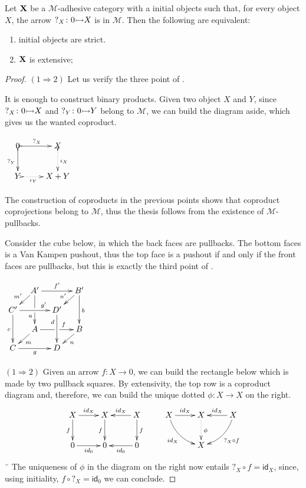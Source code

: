 \documentclass[a4paper,UKenglish,cleveref,pdftex, thm-restate,numberwithinsect]{lipics}
\newcommand{\id}[1]{\mathsf{id}_{#1}}
\newcommand{\mto}[0]{\scalebox{1}{$\rightarrowtail$}}
\def\C{\textbf {\textup{C}}}
\def\X{\textbf {\textup{X}}}
\def\Y{\textbf {\textup{Y}}}
\begin{document}
\begin{proposition}	\label{prop:ext}
Let $\X$ be a $\mathcal{M}$-adhesive category with a initial objects such that, for every object $X$, the arrow $?_X\colon 0\mto X$ is in $\mathcal{M}$. Then the following are equivalent:
\begin{enumerate}
	\item initial objects are strict.
	\item $\X$ is extensive;
\end{enumerate}
\end{proposition}
\begin{proof}
\smallskip \noindent $(1\Rightarrow 2)$ Let us verify the three point of .
\begin{enumerate}
\parbox{10cm}{\item It is enough to construct binary products. Given two object $X$ and $Y$, since $?_X\colon0 \mto X$ and $?_Y\colon0 \mto Y$ belong to $\mathcal{M}$, we can build the diagram aside, which gives us the wanted coproduct.} \parbox{3cm}{$\xymatrix{0 \ar@{>->}[d]_{?_Y}\ar@{>->}[r]^-{?_X}& X  \ar@{>.>}[d]^{\iota_X}\\Y\ar@{>.>}[r]_-{\iota_Y} & X+Y}$}
\item The construction of coproducts in the previous points shows that coproduct coprojections belong to $\mathcal{M}$, thus the thesis follows from the existence of $\mathcal{M}$-pullbacks.

\parbox{10cm}{\item Consider the cube below, in which the back faces are pullbacks. The bottom faces is a Van Kampen pushout, thus the top face is a pushout if and only if the front faces are pullbacks, but this is exactly the third point of .}\parbox{4cm}{$\xymatrix@C=10pt@R=10pt{&A'\ar[dd]|\hole_(.65){a}\ar[rr]^{f'} \ar[dl]_{m'} && B' \ar[dd]^{b} \ar[dl]_{n'} \\ C'  \ar[dd]_{c}\ar[rr]^(.7){g'} & & D' \ar[dd]_(.3){d}\\&A\ar[rr]|\hole^(.65){f} \ar[dl]^{m} && B \ar[dl]^{n} \\C \ar[rr]_{g} & & D}$}
\end{enumerate}

$(1\Rightarrow 2)$ Given an arrow $f\colon X\to 0$, we can build the rectangle below
which is made by two pullback squares. By extensivity, the top row is a coproduct diagram and, therefore, we can build the unique dotted $\phi\colon X\to X$ on the right.
\[\xymatrix{X \ar[r]^-{\id{X}} \ar[d]_{f} & X  \ar[d]_{f}& X \ar[d]^{f}\ar[l]_-{\id{X}} & X \ar@/_.3cm/[dr]_{\id{X}} \ar[r]^{\id{X}}& X  \ar@{.>}[d]^{\phi}&X \ar[l]_{\id{X}} \ar@/^.3cm/[dl]^{?_X\circ f}\\ 0 \ar[r]_-{\id{0}}&0&\ar[l]^-{\id{0}}0 &&X}\]˘
The uniqueness of $\phi$ in the diagram on the right now entails $?_X\circ f=\id{X}$, since, using initiality, $f\circ ?_X=\id{0}$ we can conclude.
\end{proof}
\end{document}
